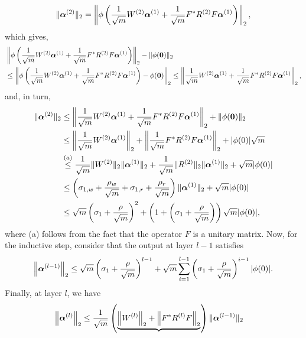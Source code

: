 \begin{lemm}
\begin{align*}
   \| \boldsymbol{\alpha}^{(2)}\|_2 
   = 
   \left\|\phi\left(\frac{1}{\sqrt{m}} W^{(2)} \boldsymbol{\alpha}^{(1)}
    +
    \frac{1}{\sqrt{m}} F^{*} R^{(2)} F \boldsymbol{\alpha}^{(1)}\right)\right\|_2,
\end{align*}
which gives,
\begin{align*}
    & \left\|\phi\left(\frac{1}{\sqrt{m}} W^{(2)} \boldsymbol{\alpha}^{(1)}
    +
    \frac{1}{\sqrt{m}} F^{*} R^{(2)} F \boldsymbol{\alpha}^{(1)}\right)\right\|_2 - \| \phi(\mathbf{0})\|_2 \\
    &\leq 
    \left\|\phi\left(\frac{1}{\sqrt{m}} W^{(2)} \boldsymbol{\alpha}^{(1)}
    +
    \frac{1}{\sqrt{m}} F^{*} R^{(2)} F \boldsymbol{\alpha}^{(1)}\right)
    - \phi(\mathbf{0})
    \right\|_2 \leq 
    \left\|\frac{1}{\sqrt{m}} W^{(2)} \boldsymbol{\alpha}^{(1)}
    +
    \frac{1}{\sqrt{m}} F^{*} R^{(2)} F \boldsymbol{\alpha}^{(1)}\right\|_2,
\end{align*}
and, in turn,
\begin{align*}
    \| \boldsymbol{\alpha}^{(2)}\|_2 
    &\leq \left\|\frac{1}{\sqrt{m}} W^{(2)} \boldsymbol{\alpha}^{(1)}
    +
    \frac{1}{\sqrt{m}} F^{*} R^{(2)} F \boldsymbol{\alpha}^{(1)}\right\|_2 + \| \phi(\mathbf{0})\|_2 \\
    &\leq \left\|\frac{1}{\sqrt{m}} W^{(2)} \boldsymbol{\alpha}^{(1)}\right\|_2+\left\|\frac{1}{\sqrt{m}} F^* R^{(2)} F \boldsymbol{\alpha}^{(1)}\right\|_2+|\phi(0)| \sqrt{m} \\
    &\overset{(a)}{\leq} \frac{1}{\sqrt{m}} \|W^{(2)}\|_2 \|\boldsymbol{\alpha}^{(1)}\|_2 + \frac{1}{\sqrt{m}} \|R^{(2)}\|_2 \| \boldsymbol{\alpha}^{(1)}\|_2 + \sqrt{m}|\phi(0)| \\
    &\leq \left( \sigma_{1,w} + \frac{\rho_w}{\sqrt{m}} + \sigma_{1,r} + \frac{\rho_r}{\sqrt{m}}\right) \| \boldsymbol{\alpha}^{(1)}\|_2 + \sqrt{m}|\phi(0)|\\
    &\leq \sqrt{m}\left( \sigma_1 + \frac{\rho}{\sqrt{m}}\right)^2 + \left(1 + \left( \sigma_1 + \frac{\rho}{\sqrt{m}}\right) \right)\sqrt{m}|\phi(0)|,
\end{align*}
where (a) follows from the fact that the operator $F$ is a unitary matrix. Now, for the inductive step, consider that the output at layer $l-1$ satisfies
\begin{align*}
    \left\|\boldsymbol{\alpha}^{(l-1)}\right\|_2 
    \leq \sqrt{m}\left(\sigma_1
    +
    \frac{\rho}{\sqrt{m}}\right)^{l-1}
    +\sqrt{m} \sum_{i=1}^{l-1}
    \left(\sigma_1
        +
        \frac{\rho}{\sqrt{m}}\right)^{i-1}|\phi(0)|.
\end{align*}
Finally, at layer $l$, we have
\begin{align}
    \left\|\aalpha^{(l)}\right\|_2 
    &\leq \frac{1}{\sqrt{m}}\left(\underbrace{\left\|W^{(l)}\right\|_2+\left\|F^* R^{(l)} F\right\|_2}\right) \| \aalpha^{(l-1)}\|_2

\end{align}
\end{lemm}
